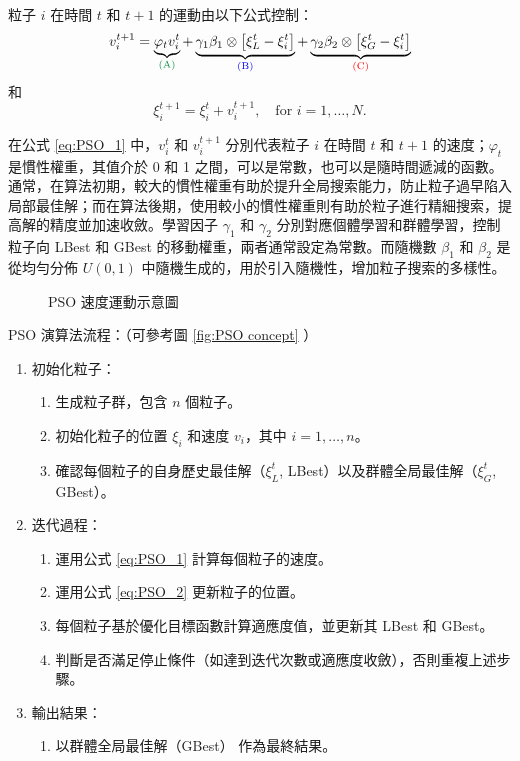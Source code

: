 粒子 $i$ 在時間 $t$ 和 $t+1$ 的運動由以下公式控制：
\begin{equation}\label{eq:PSO_1}
v_i^{t+1} = \underbrace{\varphi_{t} v_i^{t}}_{\textcolor{PowerPointGreen}{\text{(A)}}} + \underbrace{\gamma_1 \beta_1 \otimes \left[ \xi_{L}^{t} - \xi_i^{t} \right]}_{\textcolor{blue}{\text{(B)}}} + \underbrace{\gamma_2 \beta_2 \otimes \left[ \xi_G^{t} - \xi_i^{t} \right]}_{\textcolor{red}{\text{(C)}}}
\end{equation}
和
\begin{equation}\label{eq:PSO_2}
\xi_i^{t+1} = \xi_i^{t} + v_i^{t+1}, \quad \text{for } i = 1, \dots, N.
\end{equation}

\hspace*{8mm} 在公式 \eqref{eq:PSO_1} 中，$v_i^{t}$ 和 $v_i^{t+1}$ 分別代表粒子 $i$ 在時間 $t$ 和 $t+1$ 的速度；$\varphi_{t}$ 是慣性權重，其值介於 0 和 1 之間，可以是常數，也可以是隨時間遞減的函數。通常，在算法初期，較大的慣性權重有助於提升全局搜索能力，防止粒子過早陷入局部最佳解；而在算法後期，使用較小的慣性權重則有助於粒子進行精細搜索，提高解的精度並加速收斂。學習因子 $\gamma_1$ 和 $\gamma_2$ 分別對應個體學習和群體學習，控制粒子向 LBest 和 GBest 的移動權重，兩者通常設定為常數。而隨機數 $\beta_1$ 和 $\beta_2$ 是從均勻分佈 $U(0,1)$ 中隨機生成的，用於引入隨機性，增加粒子搜索的多樣性。

\begin{figure}[H]
    \caption{PSO 速度運動示意圖}
\label{fig:PSO velocity}
\end{figure}

PSO 演算法流程：（可參考圖 \ref{fig:PSO concept} ）

\begin{enumerate}
\item 初始化粒子：
\begin{enumerate}[→]
    \item 生成粒子群，包含 $n$ 個粒子。
    \item 初始化粒子的位置 $\xi_i$ 和速度 $v_i$，其中 $i = 1, \dots, n$。
    \item 確認每個粒子的自身歷史最佳解（$\xi_L^{t}$, LBest）以及群體全局最佳解（$\xi_G^{t}$, GBest）。
\end{enumerate}

\item 迭代過程：
\begin{enumerate}[→]
\item 運用公式 \eqref{eq:PSO_1} 計算每個粒子的速度。
\item 運用公式 \eqref{eq:PSO_2} 更新粒子的位置。
\item 每個粒子基於優化目標函數計算適應度值，並更新其 LBest 和 GBest。
\item 判斷是否滿足停止條件（如達到迭代次數或適應度收斂），否則重複上述步驟。
\end{enumerate}

\item 輸出結果：
\begin{enumerate}[→]
    \item 以群體全局最佳解（GBest） 作為最終結果。
\end{enumerate}
\end{enumerate}

